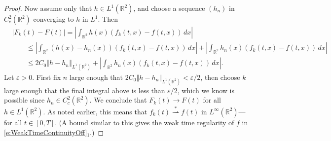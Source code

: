 \documentclass[11pt,reqno,xcolor=svgnames]{amsart}
\def\R{{\mathbb R}}
\theoremstyle{plain}
\theoremstyle{definition}
\theoremstyle{plain}
\theoremstyle{remark}
\newcommand{\abs}[1]{\left\vert#1\right\vert}
\newcommand{\iny}{\ensuremath{\infty}}
\newcommand{\norm}[1]{\ensuremath{\left\Vert #1 \right\Vert}}
\newcommand{\wstar}{\overset{*}{\rightharpoonup}}
\newcommand{\eps}{\ensuremath{\varepsilon}}
\begin{document}
\begin{proof}
    Now assume only that $h \in L^1(\R^2)$, and choose a sequence $(h_n)$ in $C_c^2(\R^2)$ converging to $h$ in $L^1$. Then
    \begin{align*}
        &\abs{F_k(t) - F(t)}
            = \abs{\int_{\R^2} h(x) (f_k(t, x) - f(t, x)) \, dx} \\
            &\qquad
            \le \abs{\int_{\R^2} (h(x) - h_n(x)) (f_k(t, x) - f(t, x)) \, dx}
                + \abs{\int_{\R^2} h_n(x) (f_k(t, x) - f(t, x)) \, dx} \\
            &\qquad
            \le 2 C_0 \norm{h - h_n}_{L^1(\R^2)}
                + \abs{\int_{\R^2} h_n(x) (f_k(t, x) - f(t, x)) \, dx}.               
    \end{align*}
    Let $\eps > 0$. First fix $n$ large enough that $2 C_0 \norm{h - h_n}_{L^1(\R^2)} < \eps/2$, then choose $k$ large enough that the final integral above is less than $\eps/2$, which we know is possible since $h_n \in C_c^2(\R^2)$.
    We conclude that $F_k(t) \to F(t)$ for all $h \in L^1(\R^2)$. As noted earlier, this means that $f_k(t) \wstar f(t) \text{ in } L^\iny(\R^2)$---for all $t \in [0, T]$.
     (A bound similar to this gives the weak time regularity of $f$ in \cref{e:WeakTimeContinuityOff}$_1$.)
\end{proof}
\end{document}
